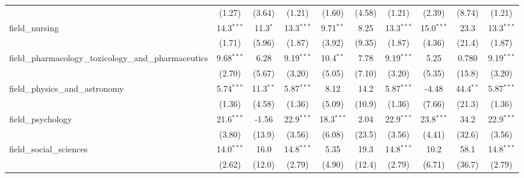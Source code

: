 \begin{tabular}{lccccccccc}
                                                               & (1.27)        & (3.64)        & (1.21)        & (1.60)        & (4.58)         & (1.21)        & (2.39)        & (8.74)        & (1.21)\\   
   field\_nursing                                              & 14.3$^{***}$  & 11.3$^{*}$    & 13.3$^{***}$  & 9.71$^{**}$   & 8.25           & 13.3$^{***}$  & 15.0$^{***}$  & 23.3          & 13.3$^{***}$\\   
                                                               & (1.71)        & (5.96)        & (1.87)        & (3.92)        & (9.35)         & (1.87)        & (4.36)        & (21.4)        & (1.87)\\   
   field\_pharmacology\_toxicology\_and\_pharmaceutics         & 9.68$^{***}$  & 6.28          & 9.19$^{***}$  & 10.4$^{**}$   & 7.78           & 9.19$^{***}$  & 5.25          & 0.780         & 9.19$^{***}$\\   
                                                               & (2.70)        & (5.67)        & (3.20)        & (5.05)        & (7.10)         & (3.20)        & (5.35)        & (15.8)        & (3.20)\\   
   field\_physics\_and\_astronomy                              & 5.74$^{***}$  & 11.3$^{**}$   & 5.87$^{***}$  & 8.12          & 14.2           & 5.87$^{***}$  & -4.48         & 44.4$^{**}$   & 5.87$^{***}$\\   
                                                               & (1.36)        & (4.58)        & (1.36)        & (5.09)        & (10.9)         & (1.36)        & (7.66)        & (21.3)        & (1.36)\\   
   field\_psychology                                           & 21.6$^{***}$  & -1.56         & 22.9$^{***}$  & 18.3$^{***}$  & 2.04           & 22.9$^{***}$  & 23.8$^{***}$  & 34.2          & 22.9$^{***}$\\   
                                                               & (3.80)        & (13.9)        & (3.56)        & (6.08)        & (23.5)         & (3.56)        & (4.41)        & (32.6)        & (3.56)\\   
   field\_social\_sciences                                     & 14.0$^{***}$  & 16.0          & 14.8$^{***}$  & 5.35          & 19.3           & 14.8$^{***}$  & 10.2          & 58.1          & 14.8$^{***}$\\   
                                                               & (2.62)        & (12.0)        & (2.79)        & (4.90)        & (12.4)         & (2.79)        & (6.71)        & (36.7)        & (2.79)\\   

\end{tabular}
